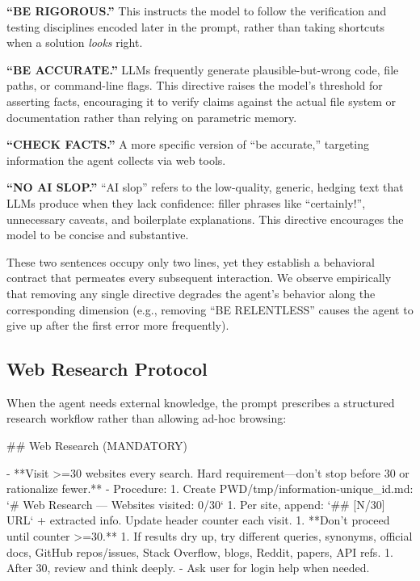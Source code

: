 \documentclass{article}
\begin{document}
\textbf{``BE RIGOROUS.''}  This instructs the model to follow the verification and testing disciplines encoded later in the prompt, rather than taking shortcuts when a solution \emph{looks} right.

\textbf{``BE ACCURATE.''}  LLMs frequently generate plausible-but-wrong code, file paths, or command-line flags.  This directive raises the model's threshold for asserting facts, encouraging it to verify claims against the actual file system or documentation rather than relying on parametric memory.

\textbf{``CHECK FACTS.''}  A more specific version of ``be accurate,'' targeting information the agent collects via web tools.

\textbf{``NO AI SLOP.''}  ``AI slop'' refers to the low-quality, generic, hedging text that LLMs produce when they lack confidence: filler phrases like ``certainly!'', unnecessary caveats, and boilerplate explanations.  This directive encourages the model to be concise and substantive.

\medskip
\noindent These two sentences occupy only two lines, yet they establish a behavioral contract that permeates every subsequent interaction.  We observe empirically that removing any single directive degrades the agent's behavior along the corresponding dimension (e.g., removing ``BE RELENTLESS'' causes the agent to give up after the first error more frequently).

\subsection{Web Research Protocol}
\label{sec:web-research}

When the agent needs external knowledge, the prompt prescribes a structured research workflow rather than allowing ad-hoc browsing:

\begin{prompt}
## Web Research (MANDATORY)

- **Visit >=30 websites every search. Hard requirement---don't stop before 30 or rationalize fewer.**
- Procedure:
  1. Create PWD/tmp/information-{unique_id}.md: `# Web Research --- Websites visited: 0/30`
  1. Per site, append: `## [N/30] URL` + extracted info. Update header counter each visit.
  1. **Don't proceed until counter >=30.**
  1. If results dry up, try different queries, synonyms, official docs, GitHub repos/issues, Stack Overflow, blogs, Reddit, papers, API refs.
  1. After 30, review and think deeply.
- Ask user for login help when needed.
\end{prompt}
\end{document}
